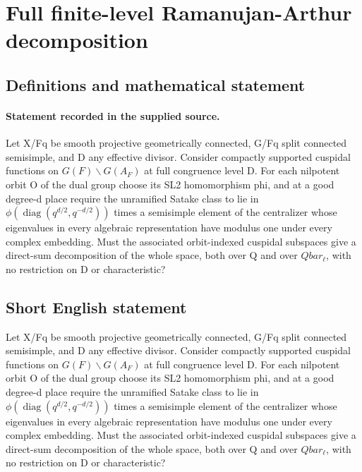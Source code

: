 \documentclass[11pt]{article}
\begin{document}
\section*{Full finite-level Ramanujan-Arthur decomposition}\label{30007262}
\subsection{Definitions and mathematical statement}
\paragraph{Statement recorded in the supplied source.}
Let X/Fq be smooth projective geometrically connected, G/Fq split connected semisimple, and D any effective divisor. Consider compactly supported cuspidal functions on $G(F)\backslash G(A_F)$ at full congruence level D. For each nilpotent orbit O of the dual group choose its SL2 homomorphism phi, and at a good degree-d place require the unramified Satake class to lie in $\phi (\operatorname{diag}(q^{d/2},q^{-d/2}))$ times a semisimple element of the centralizer whose eigenvalues in every algebraic representation have modulus one under every complex embedding. Must the associated orbit-indexed cuspidal subspaces give a direct-sum decomposition of the whole space, both over Q and over $Qbar_\ell $, with no restriction on D or characteristic?
\subsection{Short English statement}
Let X/Fq be smooth projective geometrically connected, G/Fq split connected semisimple, and D any effective divisor. Consider compactly supported cuspidal functions on $G(F)\backslash G(A_F)$ at full congruence level D. For each nilpotent orbit O of the dual group choose its SL2 homomorphism phi, and at a good degree-d place require the unramified Satake class to lie in $\phi (\operatorname{diag}(q^{d/2},q^{-d/2}))$ times a semisimple element of the centralizer whose eigenvalues in every algebraic representation have modulus one under every complex embedding. Must the associated orbit-indexed cuspidal subspaces give a direct-sum decomposition of the whole space, both over Q and over $Qbar_\ell $, with no restriction on D or characteristic?
\end{document}
